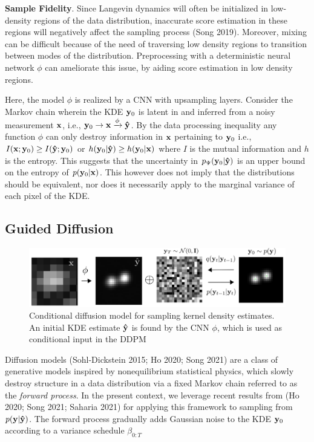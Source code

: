 \documentclass{article}
\begin{document}
\textbf{Sample Fidelity}. Since Langevin dynamics will often be initialized in low-density regions of the data distribution, inaccurate score estimation in these regions will negatively affect the sampling process (Song 2019). Moreover, mixing can be difficult because of the need of traversing low density regions to transition between modes of the distribution. Preprocessing with a deterministic neural network $\phi$ can ameliorate this issue, by aiding score estimation in low density regions. 

Here, the model $\phi$ is realized by a CNN with upsampling layers. Consider the Markov chain wherein the KDE $\bold{y}_{0}$ is latent in and inferred from a noisy measurement $\bold{x}$, i.e., $\bold{y}_{0}\rightarrow \bold{x} \xrightarrow[]{\phi}\bold{\hat{y}}$. By the data processing inequality any function $\phi$ can only destroy information in $\bold{x}$ pertaining to $\bold{y}_{0}$ i.e., $I(\bold{x};\bold{y}_0) \geq I(\bold{\hat{y}};\bold{y}_0)$ or $h(\bold{y}_0|\bold{\hat{y}}) \geq h(\bold{y}_0|\bold{x})$ where $I$ is the mutual information and $h$ is the entropy. This suggests that the uncertainty in $p_{\Psi}(\bold{y}_0|\bold{\hat{y}})$ is an upper bound on the entropy of $p(\bold{y}_0|\bold{x})$. This however does not imply that the distributions should be equivalent, nor does it necessarily apply to the marginal variance of each pixel of the KDE. 
\subsection{Guided Diffusion}

\begin{figure}
\includegraphics[scale=4.5]{Denoise.png}
\caption{Conditional diffusion model for sampling kernel density estimates. An initial KDE estimate $\bold{\hat{y}}$ is found by the CNN $\phi$, which is used as conditional input in the DDPM}
\end{figure}

Diffusion models (Sohl-Dickstein 2015; Ho 2020; Song 2021) are a class of generative models inspired by nonequilibrium statistical physics, which slowly destroy structure in a data distribution via a fixed Markov chain referred to as the \emph{forward process}. In the present context, we leverage recent results from (Ho 2020; Song 2021; Saharia 2021) for applying this framework to sampling from $p(\bold{y}|\bold{\hat{y}})$. The forward process gradually adds Gaussian noise to the KDE $\bold{y}_0$ according to a variance schedule $\beta_{0:T}$
\end{document}
